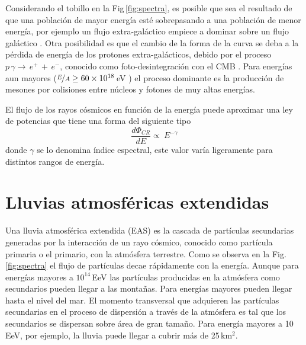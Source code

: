 Considerando el tobillo en la Fig\,\ref{fig:spectra}, es posible que sea el resultado de que una población de mayor energía esté sobrepasando a una población de menor energía, por ejemplo un flujo extra-galáctico empiece a dominar sobre un flujo galáctico \cite{bird1994cosmic}. Otra posibilidad es que el cambio de la forma de la curva se deba a la pérdida de energía de los protones extra-galácticos, debido por el proceso $p\,\gamma \rightarrow\,e^+\,+\,e^-$, conocido como foto-desintegración con el CMB \cite{berezinsky2006astrophysical}. Para energías aun mayores ($\nicefrac{E}{A} \geq 60\times 10^{18}\,$eV ) el proceso dominante es la producción de mesones por colisiones entre núcleos y fotones de muy altas energías. 

El flujo de los rayos cósmicos en función de la energía puede aproximar una ley de potencias que tiene una forma del siguiente tipo
\begin{equation}
	    \frac{d\Phi_{CR}}{dE} \propto \ E^{-\gamma}   \label{eq:expresion1}
\end{equation}
donde $\gamma$ se lo denomina índice espectral, este valor varía ligeramente para distintos rangos de energía. %


\section{Lluvias atmosféricas extendidas}

Una lluvia atmosférica extendida (EAS) es la cascada de partículas secundarias generadas por la interacción de un rayo cósmico, conocido como partícula primaria o el primario, con la atmósfera terrestre. Como se observa en la Fig.\,\ref{fig:spectra} el flujo de partículas decae rápidamente con la energía. Aunque para energías mayores a $10^{14}\,$EeV las partículas producidas en la atmósfera como secundarios pueden llegar a las montañas. Para energías mayores pueden llegar hasta el nivel del mar. El momento transversal que adquieren las partículas secundarias en el proceso de dispersión a través de la atmósfera es tal que los secundarios se dispersan sobre área de gran tamaño. Para energía mayores a 10$\,$EeV, por ejemplo, la lluvia puede llegar a cubrir más de 25\,km$^2$. 

